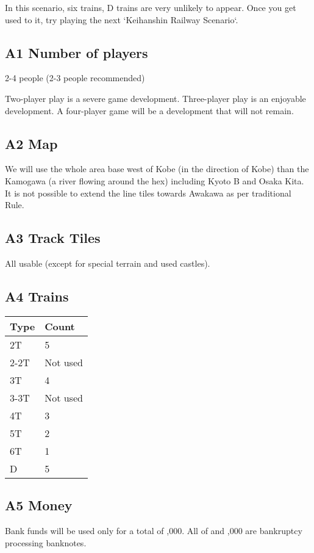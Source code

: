 \documentclass{article}
\begin{document}
\begin{CJK}{UTF8}{min}
In this scenario, six trains, D trains are very unlikely to
appear. Once you get used to it, try playing the next `Keihanshin
Railway Scenario`.

\subsection*{A1 Number of players}

2-4 people (2-3 people recommended)

Two-player play is a severe game development. Three-player play is an
enjoyable development. A four-player game will be a development that
will not remain.

\subsection*{A2 Map}

We will use the whole area base west of Kobe (in the direction of
Kobe) than the Kamogawa (a river flowing around the hex) including
Kyoto B and Osaka Kita. It is not possible to extend the line tiles
towards Awakawa as per traditional Rule.

\subsection*{A3 Track Tiles}

All usable (except for special terrain and used castles).

\subsection*{A4 Trains}
\begin{tabular}{ll}
Type & Count \\
\hline
2T & 5\\
2-2T & Not used\\
3T & 4 \\
3-3T & Not used \\
4T & 3 \\
5T & 2 \\
6T & 1 \\
D & 5
\end{tabular}

\subsection*{A5 Money}

Bank funds will be used only for a total of ,000. All of
 and ,000 are bankruptcy processing banknotes.


\end{CJK}
\end{document}
